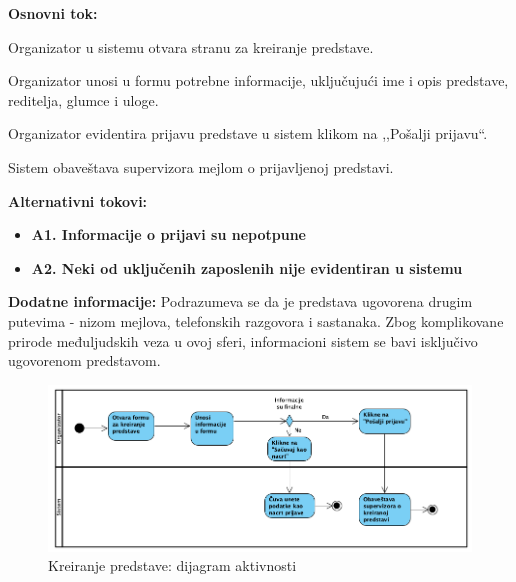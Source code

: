 \documentclass[a4paper]{article}
\begin{document}
\noindent\textbf{Osnovni tok:}
  \begin{legal}
    \item Organizator u sistemu otvara stranu za kreiranje predstave.
    \item Organizator unosi u formu potrebne informacije, uključujući ime i opis predstave, reditelja, glumce i uloge. 
    \item Organizator evidentira prijavu predstave u sistem klikom na ,,Pošalji prijavu``. 
    \item Sistem obaveštava supervizora mejlom o prijavljenoj predstavi.
  \end{legal}

\noindent\textbf{Alternativni tokovi:} 
\begin{itemize}
  \item \textbf{A1. Informacije o prijavi su nepotpune} 
  \item \textbf{A2. Neki od uključenih zaposlenih nije evidentiran u sistemu} 
\end{itemize}

\noindent\textbf{Dodatne informacije:} Podrazumeva se da je predstava ugovorena drugim putevima - nizom mejlova, telefonskih razgovora i sastanaka. Zbog komplikovane prirode međuljudskih veza u ovoj sferi, informacioni sistem se bavi isključivo ugovorenom predstavom. 

\begin{figure}[H]
  \begin{center}
      \includegraphics[width=160mm]{../images/dijagram_aktivnosti_kreiranje_predstave.png}
  \end{center}
  \caption{Kreiranje predstave: dijagram aktivnosti}
  \label{dijagram_aktivnosti_kreiranje_predstave}
\end{figure}
\end{document}
